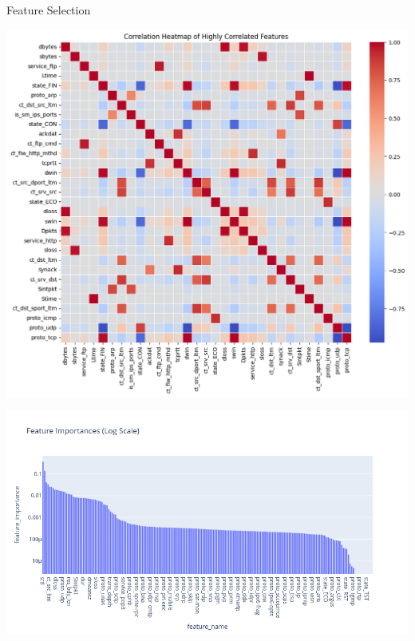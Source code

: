 \documentclass[12pt,aspectratio=169,notheorems]{beamer}
\begin{document}
\begin{frame}{Feature Selection}
    \vspace{2ex}
    \hspace*{-0.8cm}
    \begin{minipage}[t]{0.45\textwidth} 
        \centering
        \includegraphics[width=\textwidth]{Correlation_matrix.png}
        \hspace{-1cm}
        \hspace{20cm}
    \end{minipage}
    \hspace{0.5cm}
    \begin{minipage}[t]{0.45\textwidth}
        \centering
        \includegraphics[width=1.4\textwidth]{DT_features_importance.png}
        \hspace{20cm}
    \end{minipage}
\end{frame}
\end{document}
